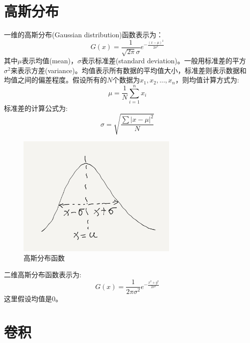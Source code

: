 \documentclass[12pt]{book}
\begin{document}
 \section{高斯分布}
 一维的高斯分布(Gaussian distribution)函数表示为：
 \begin{equation}\label{eq:1d-gaussian-distribution}
G(x)=\frac{1}{\sqrt{2\pi }\sigma }e^{-\frac{(x-\mu)^{2}}{2\sigma ^{2}}}
 \end{equation}
其中$\mu$表示均值(mean)，$\sigma$表示标准差(standard deviation)。一般用标准差的平方$\sigma^2$来表示方差(variance)。均值表示所有数据的平均值大小，标准差则表示数据和均值之间的偏差程度。假设所有的$N$个数据为$x_1, x_2, ..., x_n$，则均值计算方式为:
\begin{equation}\label{eq:1d-gaussian-distribution-mean}
\mu =\frac{1}{N}\sum_{i=1}^{n}x_i
\end{equation}
标准差的计算公式为:
\begin{equation}\label{eq:1d-gaussian-distribution-var}
\sigma =\sqrt{\frac{\sum \left |  x-\mu \right |^2}{N}}
\end{equation}

\begin{figure}[H]
	\centering
	\includegraphics[width=0.7\textwidth]{images/gaussian-distribution.png}
	\caption{高斯分布函数}
	\label{gaussian-distribution} 
\end{figure}

二维高斯分布函数表示为:
 \begin{equation}\label{eq:1d-gaussian-distribution}
	G(x)=\frac{1}{2\pi \sigma ^2 }e^{-\frac{x^2 + y^2}{2\sigma ^{2}}}
\end{equation}
这里假设均值是0。

 \section{卷积}
 
\end{document}
